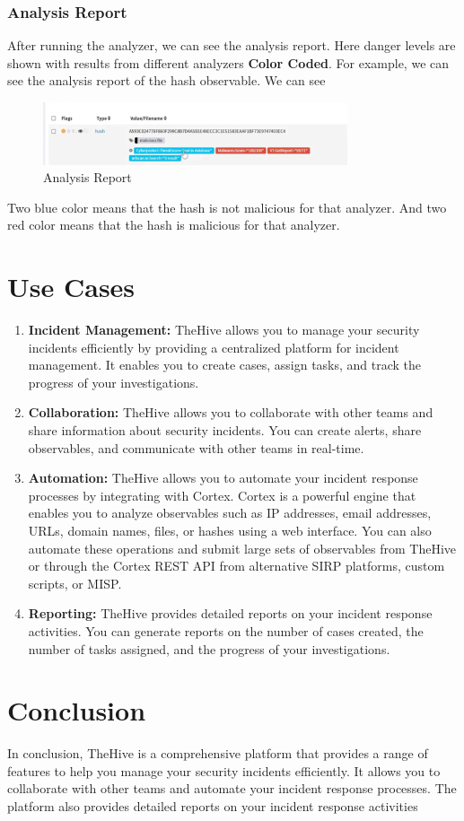 \documentclass{article}
\begin{document}
\subsubsection{Analysis Report}
After running the analyzer, we can see the analysis report. Here danger levels are shown with results from different analyzers \textbf{Color Coded}.
For example, we can see the analysis report of the hash observable.
We can see 
\begin{figure}[H]
    \centering
    \includegraphics[width=0.8\textwidth]{analyzers-result.png}
    \caption{Analysis Report}
    \label{fig:analysis-report}
\end{figure}
Two blue color means that the hash is not malicious for that analyzer. And two red color means that the hash is malicious for that analyzer.
\section*{Use Cases}
\begin{enumerate}
    \item \textbf{Incident Management:} TheHive allows you to manage your security incidents efficiently by providing a centralized platform for incident management. It enables you to create cases, assign tasks, and track the progress of your investigations.

    \item \textbf{Collaboration:} TheHive allows you to collaborate with other teams and share information about security incidents. You can create alerts, share observables, and communicate with other teams in real-time.

    \item \textbf{Automation:} TheHive allows you to automate your incident response processes by integrating with Cortex. Cortex is a powerful engine that enables you to analyze observables such as IP addresses, email addresses, URLs, domain names, files, or hashes using a web interface. You can also automate these operations and submit large sets of observables from TheHive or through the Cortex REST API from alternative SIRP platforms, custom scripts, or MISP.

    \item \textbf{Reporting:} TheHive provides detailed reports on your incident response activities. You can generate reports on the number of cases created, the number of tasks assigned, and the progress of your investigations.
\end{enumerate}

\section*{Conclusion}
In conclusion, TheHive is a comprehensive platform that provides a range of features to help you manage your security incidents efficiently. It allows you to collaborate with other teams and automate your incident response processes. The platform also provides detailed reports on your incident response activities
\end{document}
